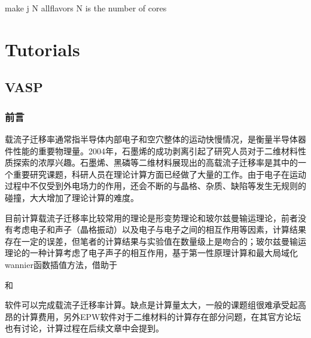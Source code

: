 \documentclass[a4paper,12pt,english]{sphinxmanual}
\begin{document}
\begin{sphinxVerbatim}[commandchars=\\\{\}]
make \PYGZhy{}j N all\PYGZhy{}flavors N is the number of cores
\end{sphinxVerbatim}


\chapter{Tutorials}
\label{\detokenize{tutorial:tutorials}}\label{\detokenize{tutorial::doc}}

\section{VASP}
\label{\detokenize{tutorial:vasp}}

\subsection{前言}
\label{\detokenize{tutorials/vasp/mobility:id1}}\label{\detokenize{tutorials/vasp/mobility::doc}}
\sphinxAtStartPar
载流子迁移率通常指半导体内部电子和空穴整体的运动快慢情况，是衡量半导体器件性能的重要物理量。2004年，石墨烯的成功剥离引起了研究人员对于二维材料性质探索的浓厚兴趣。石墨烯、黑磷等二维材料展现出的高载流子迁移率是其中的一个重要研究课题，科研人员在理论计算方面已经做了大量的工作。由于电子在运动过程中不仅受到外电场力的作用，还会不断的与晶格、杂质、缺陷等发生无规则的碰撞，大大增加了理论计算的难度。

\sphinxAtStartPar
目前计算载流子迁移率比较常用的理论是形变势理论和玻尔兹曼输运理论，前者没有考虑电子和声子（晶格振动）以及电子与电子之间的相互作用等因素，计算结果存在一定的误差，但笔者的计算结果与实验值在数量级上是吻合的；玻尔兹曼输运理论的一种计算考虑了电子\sphinxhyphen{}声子的相互作用，基于第一性原理计算和最大局域化wannier函数插值方法，借助于 %
\begin{footnote}[13]\sphinxAtStartFootnote
{}
%
\end{footnote} 和 %
\begin{footnote}[14]\sphinxAtStartFootnote
{}
%
\end{footnote} 软件可以完成载流子迁移率计算。缺点是计算量太大，一般的课题组很难承受起高昂的计算费用，另外EPW软件对于二维材料的计算存在部分问题，在其官方论坛也有讨论，计算过程在后续文章中会提到。
\end{document}
